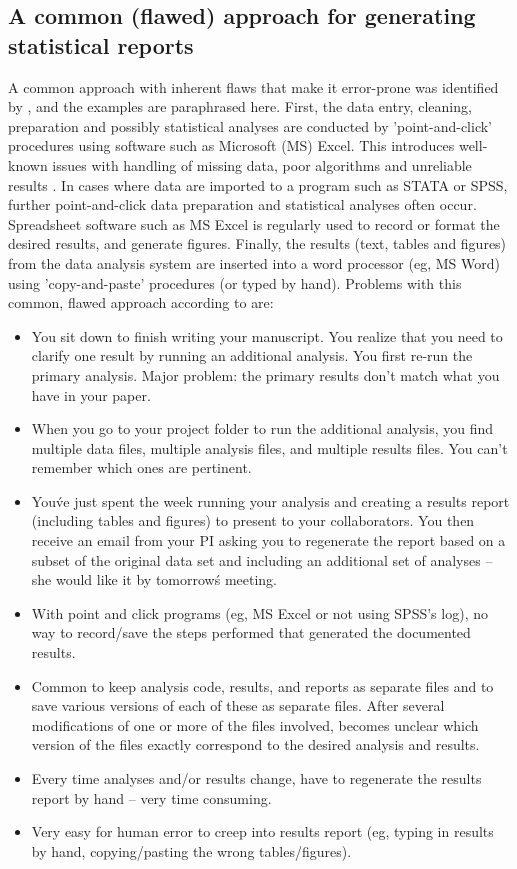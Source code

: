 \documentclass[11pt,a4paper]{article}
\begin{document}
\subsection{A common (flawed) approach for generating statistical reports}

A common approach with inherent flaws that make it error-prone was identified by \citet{Scott}, and the examples are paraphrased here.  
First, the data entry, cleaning, preparation and possibly statistical analyses are conducted by 'point-and-click' procedures using software such as Microsoft (MS) Excel.
This introduces well-known issues with handling of missing data, poor algorithms and unreliable results \citep{McCullough2008}.
In cases where data are imported to a program such as STATA or SPSS, further point-and-click data preparation and statistical analyses often occur.
Spreadsheet software such as MS Excel is regularly used to record or format the desired results, and generate figures.
Finally, the results (text, tables and figures) from the data analysis system are inserted into a word processor (eg, MS Word) using 'copy-and-paste' procedures (or typed by hand). 
\clearpage
Problems with this common, flawed approach according to \citet{Scott} are:
\begin{itemize}
\item You sit down to finish writing your manuscript. You realize that you need to clarify one result by running an additional analysis. You first re-run the primary analysis. Major problem: the primary results don’t match what you have in your paper.
\item When you go to your project folder to run the additional analysis, you find multiple data files, multiple analysis files,
and multiple results files. You can’t remember which ones are pertinent.
\item You\'ve just spent the week running your analysis and creating a results report (including tables and figures) to present to your collaborators. You then receive an email from your PI asking you to regenerate the report based on a subset of the original data set and including an additional set of analyses – she would like it by tomorrow\'s meeting.
\item With point and click programs (eg, MS Excel or not using SPSS’s log), no way to record/save the steps performed that generated the documented results.
\item Common to keep analysis code, results, and reports as separate files and to save various versions of each of these as separate files.
After several modifications of one or more of the files involved, becomes unclear which version of the files exactly correspond to the desired analysis and results.
\item Every time analyses and/or results change, have to regenerate the results report by hand – very time consuming.
\item Very easy for human error to creep into results report (eg, typing in results by hand, copying/pasting the wrong tables/figures).
\end{itemize}
\end{document}
